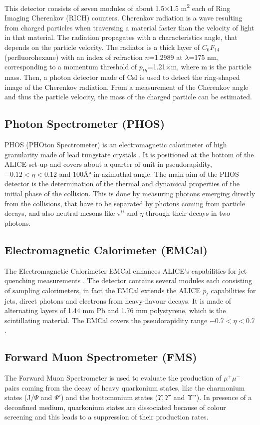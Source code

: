 This detector consists of seven modules of about 1.5$\times$1.5 m\textsuperscript{2} each of Ring Imaging Cherenkov (RICH) counters. Cherenkov radiation is a wave resulting from charged particles when traversing a material faster than the velocity of light in that material. The radiation propagates with a characteristics angle, that depends on the particle velocity. The radiator is a thick layer of $C_6F_{14}$ (perfluorohexane) with an index of refraction $n$=1.2989 at $\lambda$=175 nm, corresponding to a momentum threshold of $p_{th}$=1.21$\times$m, where m is the particle mass. Then, a photon detector made of CsI is used to detect the ring-shaped image of the Cherenkov radiation. From a measurement of the Cherenkov angle and thus the particle velocity, the mass of the charged particle can be estimated.

\subsection{Photon Spectrometer (PHOS)}
PHOS (PHOton Spectrometer) is an electromagnetic calorimeter of high granularity made of lead tungstate crystals \cite{PHOS-TDR}. It is positioned at the bottom of the ALICE set-up and covers about a quarter of unit in pseudorapidity, $-0.12<\eta<0.12$ and $100Â°$ in azimuthal angle. The main aim of the PHOS detector is the determination of the thermal and dynamical properties of the initial phase of the collision. This is done by measuring photons emerging directly from the collisions, that have to be separated by photons coming from particle decays, and also neutral mesons like $\pi^0$ and $\eta$ through their decays in two photons.

\subsection{Electromagnetic Calorimeter (EMCal)}
The Electromagnetic Calorimeter EMCal enhances ALICE's capabilities for jet quenching measurements \cite{EMCal-TDR}.
The detector contains several modules each consisting of sampling calorimeters, in fact the EMCal extends the ALICE $p_t$ capabilities for jets, direct photons and electrons from heavy-flavour decays. It is made of alternating layers of 1.44 mm Pb and 1.76 mm polystyrene, which is the scintillating material. The EMCal covers the pseudorapidity range $-0.7 < \eta < 0.7$.

\subsection{Forward Muon Spectrometer (FMS)}
The Forward Muon Spectrometer is used to evaluate the production of $\mu^+\mu^-$ pairs coming from the decay of heavy quarkonium states, like the charmonium states (J/$\Psi$ and $\Psi'$) and the bottomonium states ($\Upsilon, \Upsilon'$ and $ \Upsilon"$). In presence of a deconfined medium, quarkonium states are dissociated because of colour  screening and this leads to a suppression of their production rates.

